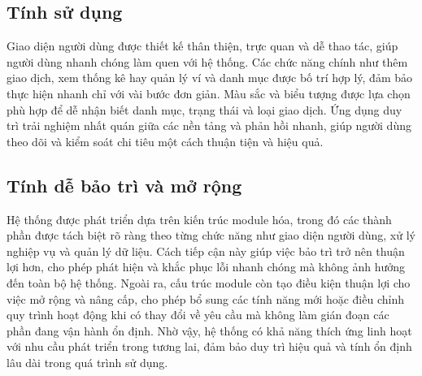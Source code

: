 \documentclass[../DoAn.tex]{subfiles}
\begin{document}
\subsection{Tính sử dụng}
Giao diện người dùng được thiết kế thân thiện, trực quan và dễ thao tác, giúp người dùng nhanh chóng làm quen với hệ thống. Các chức năng chính như thêm giao dịch, xem thống kê hay quản lý ví và danh mục được bố trí hợp lý, đảm bảo thực hiện nhanh chỉ với vài bước đơn giản. Màu sắc và biểu tượng được lựa chọn phù hợp để dễ nhận biết danh mục, trạng thái và loại giao dịch. Ứng dụng duy trì trải nghiệm nhất quán giữa các nền tảng và phản hồi nhanh, giúp người dùng theo dõi và kiểm soát chi tiêu một cách thuận tiện và hiệu quả.


\subsection{Tính dễ bảo trì và mở rộng}
Hệ thống được phát triển dựa trên kiến trúc module hóa, trong đó các thành phần được tách biệt rõ ràng theo từng chức năng như giao diện người dùng, xử lý nghiệp vụ và quản lý dữ liệu. Cách tiếp cận này giúp việc bảo trì trở nên thuận lợi hơn, cho phép phát hiện và khắc phục lỗi nhanh chóng mà không ảnh hưởng đến toàn bộ hệ thống. Ngoài ra, cấu trúc module còn tạo điều kiện thuận lợi cho việc mở rộng và nâng cấp, cho phép bổ sung các tính năng mới hoặc điều chỉnh quy trình hoạt động khi có thay đổi về yêu cầu mà không làm gián đoạn các phần đang vận hành ổn định. Nhờ vậy, hệ thống có khả năng thích ứng linh hoạt với nhu cầu phát triển trong tương lai, đảm bảo duy trì hiệu quả và tính ổn định lâu dài trong quá trình sử dụng.
\end{document}
